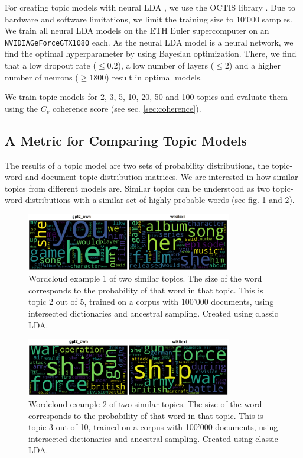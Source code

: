 For creating topic models with neural LDA \cite{neuralLDA}, we use the OCTIS library \cite{octis}. Due to hardware and software limitations, we limit the training size to 10'000 samples. We train all neural LDA models on the ETH Euler supercomputer on an \texttt{NVIDIAGeForceGTX1080} each. As the neural LDA model is a neural network, we find the optimal hyperparameter by using Bayesian optimization. There, we find that a low dropout rate ($\le0.2$), a low number of layers ($\leq2$) and a higher number of neurons ($\geq1800$) result in optimal models.

We train topic models for 2, 3, 5, 10, 20, 50 and 100 topics and evaluate them using the $C_v$ coherence score (see sec. \ref{sec:coherence}).

\subsection{A Metric for Comparing Topic Models}
The results of a topic model are two sets of probability distributions, the topic-word and document-topic distribution matrices. We are interested in how similar topics from different models are. Similar topics can be understood as two topic-word distributions with a similar set of highly probable words (see fig. \ref{fig:wordcloud-gpt2_nt-wiki_nt-5-2} and \ref{fig:wordcloud-gpt2_nt-wiki_nt-10-3}). 
\begin{figure}[H]
    \centering
    \includegraphics[width=0.8\textwidth]{figures/wordcloud-gpt2_nt-wiki_nt-5-2}
    \caption{Wordcloud example 1 of two similar topics. The size of the word corresponds to the probability of that word in that topic. This is topic 2 out of 5, trained on a corpus with 100'000 documents, using intersected dictionaries and ancestral sampling. Created using classic LDA.}
    \label{fig:wordcloud-gpt2_nt-wiki_nt-5-2}
\end{figure}
\begin{figure}[H]
    \centering
    \includegraphics[width=0.8\textwidth]{figures/wordcloud-gpt2_nt-wiki_nt-10-3}
    \caption{Wordcloud example 2 of two similar topics. The size of the word corresponds to the probability of that word in that topic. This is topic 3 out of 10, trained on a corpus with 100'000 documents, using intersected dictionaries and ancestral sampling. Created using classic LDA.}
    \label{fig:wordcloud-gpt2_nt-wiki_nt-10-3}
\end{figure}
